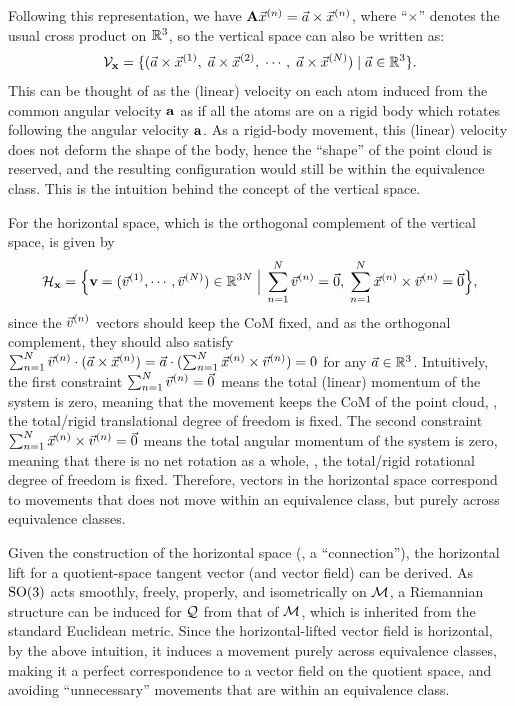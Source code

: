 Following this representation, we have $\mathbf{A} \vec{x}^{(n)} = \vec{a} \times \vec{x}^{(n)}$, where ``$\times$'' denotes the usual cross product on $\mathbb{R}^3$, so the vertical space can also be written as:
\begin{align}
    \mathcal{V}_{\mathbf{x}} = \{ (\vec{a} \times \vec{x}^{(1)},\; \vec{a} \times \vec{x}^{(2)},\; \cdots,\; \vec{a} \times \vec{x}^{(N)}) \mid \vec{a} \in \mathbb{R}^3 \}.
    \label{eqn:so3-vert}
\end{align}
This can be thought of as the (linear) velocity on each atom induced from the common angular velocity $\mathbf{a}$ as if all the atoms are on a rigid body which rotates following the angular velocity $\mathbf{a}$. As a rigid-body movement, this (linear) velocity does not deform the shape of the body, hence the ``shape'' of the point cloud is reserved, and the resulting configuration would still be within the equivalence class. This is the intuition behind the concept of the vertical space.

For the horizontal space, which is the orthogonal complement of the vertical space, is given by
\begin{align}
    \mathcal{H}_{\mathbf{x}} = \Bigl\{ \mathbf{v} = (\vec{v}^{(1)}, \cdots, \vec{v}^{(N)}) \in \mathbb{R}^{3N} \; \Big\vert \; \sum_{n=1}^N \vec{v}^{(n)} =\vec{0}, \; \sum_{n=1}^N \vec{x}^{(n)} \times \vec{v}^{(n)} = \vec{0} \Bigr\},
    \label{eqn:so3-horiz}
\end{align}
since the $\vec{v}^{(n)}$ vectors should keep the CoM fixed, and as the orthogonal complement, they should also satisfy $\sum_{n=1}^N \vec{v}^{(n)} \cdot (\vec{a} \times \vec{x}^{(n)}) = \vec{a} \cdot (\sum_{n=1}^N \vec{x}^{(n)} \times \vec{v}^{(n)}) = 0$ for any $\vec{a} \in \mathbb{R}^3$.
Intuitively, the first constraint $\sum_{n=1}^N \vec{v}^{(n)} =\vec{0}$ means the total (linear) momentum of the system is zero, meaning that the movement keeps the CoM of the point cloud, \ie, the total/rigid translational degree of freedom is fixed.
The second constraint $\sum_{n=1}^N \vec{x}^{(n)} \times \vec{v}^{(n)} = \vec{0}$ means the total angular momentum of the system is zero, meaning that there is no net rotation as a whole, \ie, the total/rigid rotational degree of freedom is fixed.
Therefore, vectors in the horizontal space correspond to movements that does not move within an equivalence class, but purely across equivalence classes.

Given the construction of the horizontal space (\ie, a ``connection''), the horizontal lift for a quotient-space tangent vector (and vector field) can be derived. As $\mathrm{SO}(3)$ acts smoothly, freely, properly, and isometrically on $\mathcal{M}$, a Riemannian structure can be induced for $\mathcal{Q}$ from that of $\mathcal{M}$, which is inherited from the standard Euclidean metric.
Since the horizontal-lifted vector field is horizontal, by the above intuition, it induces a movement purely across equivalence classes, making it a perfect correspondence to a vector field on the quotient space, and avoiding ``unnecessary'' movements that are within an equivalence class.


